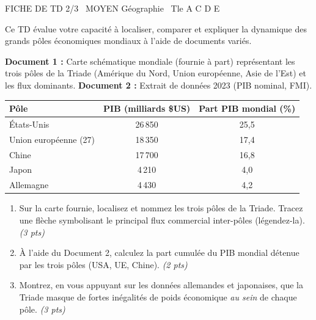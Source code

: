 \documentclass[11pt]{article}
\begin{document}
\begin{tcolorbox}[enhanced,colback=popink,colframe=popink,arc=10pt,boxrule=0pt,left=12pt,right=12pt,top=9pt,bottom=9pt]
{\color{white}\popxbold\small FICHE DE TD 2/3 \textbullet\ MOYEN \hfill Géographie \textbullet\ Tle A C D E\par}
\end{tcolorbox}
\vspace{4pt}
Ce TD évalue votre capacité à localiser, comparer et expliquer la dynamique des grands pôles économiques mondiaux à l'aide de documents variés.

\begin{exercice}
\label{exo:triade}
\textbf{Document 1 :} Carte schématique mondiale (fournie à part) représentant les trois pôles de la Triade (Amérique du Nord, Union européenne, Asie de l'Est) et les flux dominants.
\textbf{Document 2 :} Extrait de données 2023 (PIB nominal, FMI).

\begin{center}
\begin{tabular}{lcc}
\toprule
Pôle & PIB (milliards \$US) & Part PIB mondial (\%)\\
\midrule
États-Unis & 26\,850 & 25,5 \\
Union européenne (27) & 18\,350 & 17,4 \\
Chine & 17\,700 & 16,8 \\
Japon & 4\,210 & 4,0 \\
Allemagne & 4\,430 & 4,2 \\
\bottomrule
\end{tabular}
\end{center}

\begin{enumerate}
\item Sur la carte fournie, localisez et nommez les trois pôles de la Triade. Tracez une flèche symbolisant le principal flux commercial inter-pôles (légendez-la). \textit{(3 pts)}
\item À l'aide du Document 2, calculez la part cumulée du PIB mondial détenue par les trois pôles (USA, UE, Chine). \textit{(2 pts)}
\item Montrez, en vous appuyant sur les données allemandes et japonaises, que la Triade masque de fortes inégalités de poids économique \textit{au sein} de chaque pôle. \textit{(3 pts)}
\end{enumerate}
\end{exercice}
\end{document}
